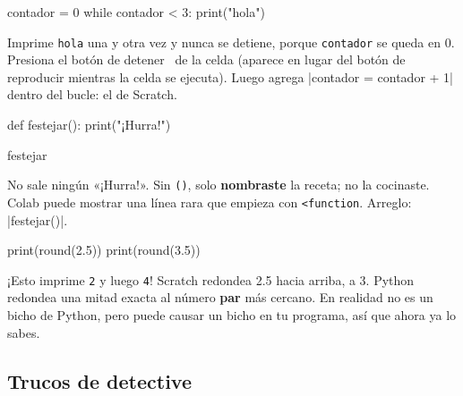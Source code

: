 \noindent\begin{minipage}[c]{0.55\linewidth}
\begin{code}
contador = 0
while contador < 3:
    print("hola")
\end{code}
\end{minipage}\hfill
\begin{minipage}[c]{0.42\linewidth}\small\raggedright
Imprime \texttt{hola} una y otra vez y nunca se detiene, porque \texttt{contador} se queda en 0. Presiona el botón de detener \stopbtn\ de la celda (aparece en lugar del botón de reproducir mientras la celda se ejecuta). Luego agrega \py|contador = contador + 1| dentro del bucle: el  de Scratch.
\end{minipage}

\noindent\begin{minipage}[c]{0.55\linewidth}
\begin{code}
def festejar():
    print("¡Hurra!")

festejar
\end{code}
\end{minipage}\hfill
\begin{minipage}[c]{0.42\linewidth}\small\raggedright
No sale ningún «¡Hurra!». Sin \texttt{()}, solo \textbf{nombraste} la receta; no la cocinaste. Colab puede mostrar una línea rara que empieza con \texttt{<function}. Arreglo: \py|festejar()|.
\end{minipage}

\noindent\begin{minipage}[c]{0.55\linewidth}
\begin{code}
print(round(2.5))
print(round(3.5))
\end{code}
\end{minipage}\hfill
\begin{minipage}[c]{0.42\linewidth}\small\raggedright
¡Esto imprime \texttt{2} y luego \texttt{4}! Scratch redondea 2.5 hacia arriba, a 3. Python redondea una mitad exacta al número \textbf{par} más cercano. En realidad no es un bicho de Python, pero puede causar un bicho en tu programa, así que ahora ya lo sabes.
\end{minipage}

\subsection*{Trucos de detective}

